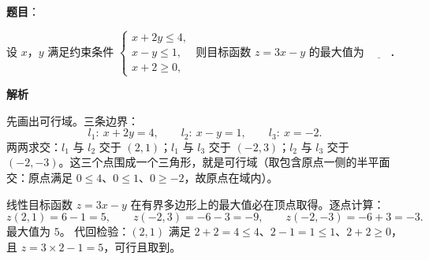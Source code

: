 \begin{answer}

\textbf{题目}：

设 $x$，$y$ 满足约束条件 $\begin{cases}x+2y\leqslant 4,\\[2pt]x-y\leqslant 1,\\[2pt]x+2\geqslant 0,\end{cases}$ 则目标函数 $z=3x-y$ 的最大值为 $\underline{\qquad}$．

\textbf{解析}

先画出可行域。三条边界：
\nopagebreak[4]
\[l_1:\ x+2y=4,\qquad l_2:\ x-y=1,\qquad l_3:\ x=-2.\]
两两求交：$l_1$ 与 $l_2$ 交于 $(2,1)$；$l_1$ 与 $l_3$ 交于 $(-2,3)$；$l_2$ 与 $l_3$ 交于 $(-2,-3)$。这三个点围成一个三角形，就是可行域（取包含原点一侧的半平面交：原点满足 $0\leqslant 4$、$0\leqslant 1$、$0\geqslant -2$，故原点在域内）。

线性目标函数 $z=3x-y$ 在有界多边形上的最大值必在顶点取得。逐点计算：
\nopagebreak[4]
\[z(2,1)=6-1=5,\qquad z(-2,3)=-6-3=-9,\qquad z(-2,-3)=-6+3=-3.\]
最大值为 $5$。
代回检验：$(2,1)$ 满足 $2+2=4\leqslant 4$、$2-1=1\leqslant 1$、$2+2\geqslant 0$，且 $z=3\times2-1=5$，可行且取到。


\end{answer}
